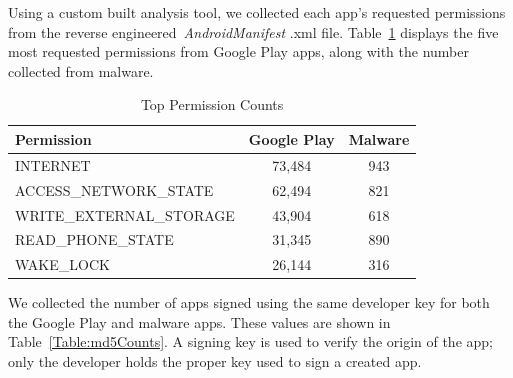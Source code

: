 \documentclass{sig-alternate-05-2015}
\begin{document}



Using a custom built analysis tool, we collected each app's requested permissions from the reverse engineered~\emph{AndroidManifest} .xml file. Table~\ref{Table:permissionCounts} displays the five most requested permissions from Google Play apps, along with the number collected from malware.

\begin{table}[ht]
\begin{center}
\caption{Top Permission Counts}
\label{Table:permissionCounts}
 \begin{tabular}{ | l | c | c | } \hline

	  \bfseries Permission & \bfseries   Google Play & \bfseries Malware \\ \hline
	
	INTERNET &	73,484 & 943  \\ \hline
	ACCESS\_NETWORK\_STATE &	62,494 & 821 \\ \hline
	WRITE\_EXTERNAL\_STORAGE &	43,904 & 618\\ \hline
	READ\_PHONE\_STATE &	31,345 & 890 \\ \hline
	WAKE\_LOCK & 26,144 & 316 \\ \hline	
        	 	
  \end{tabular}
\end{center}
\end{table}


We collected the number of apps signed using the same developer key for both the Google Play and malware apps. These values are shown in Table~\ref{Table:md5Counts}. A signing key is used to verify the origin of the app; only the developer holds the proper key used to sign a created app.
\end{document}
